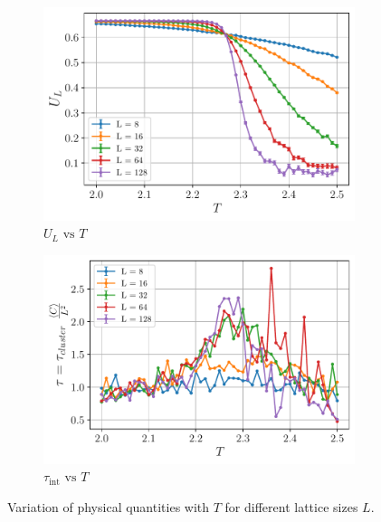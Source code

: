 \documentclass[../thesis_main.tex]{subfiles}
\begin{document}
\begin{figure}[!htb]\ContinuedFloat
    \centering
    \begin{subfigure}[b]{0.49\textwidth}
        \centering
        \includegraphics[width=\textwidth]{images/monte_carlo/wolff_cluster/U_L.pdf}
        \caption{$U_L \text{ vs } T$}
        \label{bindercumulant}
    \end{subfigure}
    \begin{subfigure}[b]{0.49\textwidth}
        \centering
        \includegraphics[width=\textwidth]{images/monte_carlo/wolff_cluster/autocorr times.pdf}
        \caption{$\tau_\text{int} \text{ vs } T$}
        \label{autocorrelationtime}
    \end{subfigure}
    \caption{Variation of physical quantities with $T$ for different lattice sizes $L$.}
    \label{expvalvsT}
\end{figure}
\end{document}
